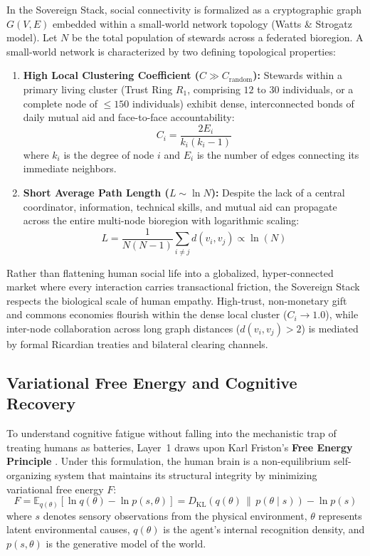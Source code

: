 In the Sovereign Stack, social connectivity is formalized as a cryptographic graph $G(V, E)$ embedded within a small-world network topology (Watts \& Strogatz model). Let $N$ be the total population of stewards across a federated bioregion. A small-world network is characterized by two defining topological properties:
\begin{enumerate}
    \item \textbf{High Local Clustering Coefficient ($C \gg C_{\mathrm{random}}$):} Stewards within a primary living cluster (Trust Ring $R_1$, comprising $12$ to $30$ individuals, or a complete node of $\le 150$ individuals) exhibit dense, interconnected bonds of daily mutual aid and face-to-face accountability:
    \begin{equation}
    C_i = \frac{2 E_i}{k_i (k_i - 1)}
    \label{eq:clustering_coefficient}
    \end{equation}
    where $k_i$ is the degree of node $i$ and $E_i$ is the number of edges connecting its immediate neighbors.
    \item \textbf{Short Average Path Length ($L \sim \ln N$):} Despite the lack of a central coordinator, information, technical skills, and mutual aid can propagate across the entire multi-node bioregion with logarithmic scaling:
    \begin{equation}
    L = \frac{1}{N(N - 1)} \sum_{i \ne j} d(v_i, v_j) \propto \ln(N)
    \label{eq:small_world_path}
    \end{equation}
\end{enumerate}
Rather than flattening human social life into a globalized, hyper-connected market where every interaction carries transactional friction, the Sovereign Stack respects the biological scale of human empathy. High-trust, non-monetary gift and commons economies flourish within the dense local cluster ($C_i \to 1.0$), while inter-node collaboration across long graph distances ($d(v_i, v_j) > 2$) is mediated by formal Ricardian treaties and bilateral clearing channels.

\subsection{Variational Free Energy and Cognitive Recovery}
To understand cognitive fatigue without falling into the mechanistic trap of treating humans as batteries, Layer~1 draws upon Karl Friston's \textbf{Free Energy Principle} \cite{friston2010free}. Under this formulation, the human brain is a non-equilibrium self-organizing system that maintains its structural integrity by minimizing variational free energy $F$:
\begin{equation}
F = \mathbb{E}_{q(\theta)} \left[ \ln q(\theta) - \ln p(s, \theta) \right] = D_{\mathrm{KL}}\left(q(\theta) \,\parallel\, p(\theta \mid s)\right) - \ln p(s)
\label{eq:free_energy_principle}
\end{equation}
where $s$ denotes sensory observations from the physical environment, $\theta$ represents latent environmental causes, $q(\theta)$ is the agent's internal recognition density, and $p(s, \theta)$ is the generative model of the world.

